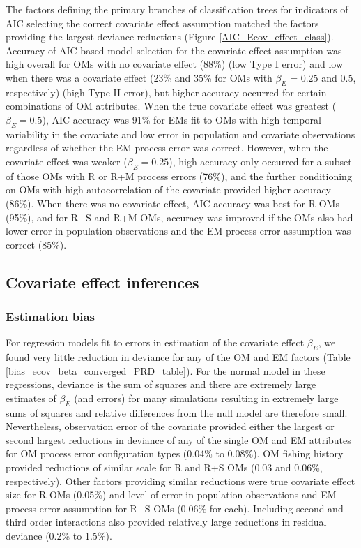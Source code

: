 \documentclass[
  12pt,
]{article}
\begin{document}
The factors defining the primary branches of classification trees for indicators of AIC selecting the correct covariate effect assumption matched the factors providing the largest deviance reductions (Figure \ref{AIC_Ecov_effect_class}). Accuracy of AIC-based model selection for the covariate effect assumption was high overall for OMs with no covariate effect (88\%) (low Type I error) and low when there was a covariate effect (23\% and 35\% for OMs with \(\beta_E\) = 0.25 and 0.5, respectively) (high Type II error), but higher accuracy occurred for certain combinations of OM attributes. When the true covariate effect was greatest (\(\beta_E = 0.5\)), AIC accuracy was 91\% for EMs fit to OMs with high temporal variability in the covariate and low error in population and covariate observations regardless of whether the EM process error was correct. However, when the covariate effect was weaker (\(\beta_E = 0.25\)), high accuracy only occurred for a subset of those OMs with R or R+M process errors (76\%), and the further conditioning on OMs with high autocorrelation of the covariate provided higher accuracy (86\%). When there was no covariate effect, AIC accuracy was best for R OMs (95\%), and for R+S and R+M OMs, accuracy was improved if the OMs also had lower error in population observations and the EM process error assumption was correct (85\%).

\subsection*{Covariate effect inferences}\label{covariate-effect-inferences}

\subsubsection*{Estimation bias}\label{estimation-bias}

For regression models fit to errors in estimation of the covariate effect \(\beta_E\), we found very little reduction in deviance for any of the OM and EM factors (Table \ref{bias_ecov_beta_converged_PRD_table}). For the normal model in these regressions, deviance is the sum of squares and there are extremely large estimates of \(\beta_E\) (and errors) for many simulations resulting in extremely large sums of squares and relative differences from the null model are therefore small. Nevertheless, observation error of the covariate provided either the largest or second largest reductions in deviance of any of the single OM and EM attributes for OM process error configuration types (0.04\% to 0.08\%). OM fishing history provided reductions of similar scale for R and R+S OMs (0.03 and 0.06\%, respectively). Other factors providing similar reductions were true covariate effect size for R OMs (0.05\%) and level of error in population observations and EM process error assumption for R+S OMs (0.06\% for each). Including second and third order interactions also provided relatively large reductions in residual deviance (0.2\% to 1.5\%).
\end{document}
